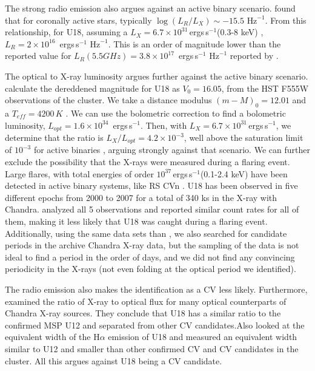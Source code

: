 \documentclass[fleqn,usenatbib,useAMS,letters]{mnras}
\newcommand{\ergs}{\,ergs\,s$^{-1}$} %
\begin{document}
 
 The strong radio emission also argues against an active binary scenario. \citet{Guedel1993} found that for coronally active stars, typically $\log(L_R/L_X) \sim -15.5 \text{ Hz}^{-1}$. From this relationship, for U18, assuming a $L_X= 6.7 \times 10 ^{31}$\ergs (0.3-8 keV) \citep{bogdanov_chandra_2010}, $L_R = 2 \times 10^{16}$ \ergs $\text{ Hz}^{-1}$. This is an order of magnitude lower than the reported value for $L_R (5.5 GHz) = 3.8\times 10^{17}$ \ergs $\text{ Hz}^{-1}$ reported by \citet{CoryPaper}. 
 

 
 The optical to X-ray luminosity argues further against the active binary scenario. \cite{Pallanca2017Halpha} calculate the dereddened  magnitude for U18 as $V_0 = 16.05$, from the HST F555W observations of the cluster. We take a distance modulus $(m-M)_0 = 12.01$ \citep{Gratton2003} and a $T_{eff} = 4200 \, K$ \citep{Husser2016MUSE}. We can use the \cite{Flower1996BC} bolometric correction to find a bolometric luminosity, $L_{opt} = 1.6 \times 10^{34}$ \ergs.  Then, with $L_X= 6.7 \times 10 ^{31}$\ergs \citep[0.3-8 keV;][]{bogdanov_chandra_2010}, we determine that the ratio is $L_X/L_{opt} = 4.2 \times 10^{-3}$, well above the saturation limit of $10^{-3}$ for active binaries \citep{VilhuSaturation2,VilhuSaturationLimit}, arguing strongly against that scenario. We can further exclude the possibility that the X-rays were measured during a flaring event. Large flares, with total energies of order $10^{37}$\ergs  (0.1-2.4 keV) have been detected in active binary systems, like RS CVn \citep[e.g.,][]{Kuerster1996}. U18 has been observed in five different epochs from 2000 to 2007 for a total of 340 ks in the X-ray with Chandra. \citet{bogdanov_chandra_2010} analyzed all 5 observations and reported similar count rates for all of them, making it less likely that U18 was caught during a flaring event. 
Additionally, using the same data sets than \citet{bogdanov_chandra_2010}, we also searched for candidate periods in the archive Chandra X-ray data, but the sampling of the data is not ideal to find a period in the order of days, and we did not find any convincing periodicity in the X-rays (not even folding at the optical period we identified). 

 
 The radio emission also makes the identification as a CV less likely. Furthermore, \cite{cohn_identification_2010} examined the ratio of X-ray to optical flux for many optical counterparts of Chandra X-ray sources. They conclude that U18 has a similar ratio to the confirmed MSP U12 and separated from other CV candidates.Also  \cite{Pallanca2017Halpha} looked at the equivalent width of the H$\alpha$ emission of U18 and measured an equivalent width similar to U12 and smaller than other confirmed CV and CV candidates in the cluster. All this argues against U18 being a CV candidate.
 
\end{document}
